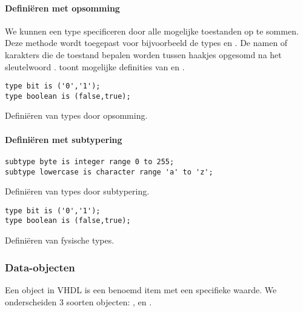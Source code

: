 \paragraph{Defini\"eren met opsomming} We kunnen een type specificeren door alle mogelijke toestanden op te sommen. Deze methode wordt toegepast voor bijvoorbeeld de types  en . De namen of karakters die de toestand bepalen worden tussen haakjes opgesomd na het sleutelwoord .  toont mogelijke definities van  en .
\begin{vhdlcode}[hbt]
\begin{lstlisting}
type bit is ('0','1');
type boolean is (false,true);
\end{lstlisting}
\caption{Defini\"eren van types door opsomming.}
\label{lst:constante}
\end{vhdlcode}

\begin{vhdlcode}[hbt]
\paragraph{Defini\"eren met subtypering}
\begin{lstlisting}
subtype byte is integer range 0 to 255;
subtype lowercase is character range 'a' to 'z';
\end{lstlisting}
\caption{Defini\"eren van types door subtypering.}
\label{lst:constante}
\end{vhdlcode}

\begin{vhdlcode}[hbt]
\begin{lstlisting}
type bit is ('0','1');
type boolean is (false,true);
\end{lstlisting}
\caption{Defini\"eren van fysische types.}
\label{lst:constante}
\end{vhdlcode}
\subsubsection{Data-objecten}
Een object in VHDL is een benoemd item met een specifieke waarde. We onderscheiden 3 soorten objecten: ,  en .
